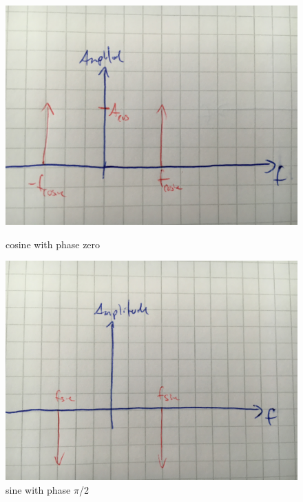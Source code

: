 \documentclass[12pt]{article}
\begin{document}
\begin{figure}[!htbp]
  \centering
  \begin{minipage}[b]{0.45\textwidth}
    \includegraphics[width=\textwidth]{images/cosine}
    \caption{cosine with phase zero}
  \end{minipage}
  \hfill
  \begin{minipage}[b]{0.45\textwidth}
    \includegraphics[width=\textwidth]{images/sine}
    \caption{sine with phase $\pi$/2}
  \end{minipage}
\end{figure}
\end{document}
